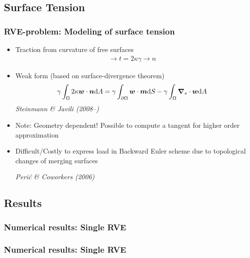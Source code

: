 \documentclass[11pt,mathserif]{beamer}
\newcommand{\roughcite}[1]{\textit{#1}}
\begin{document}
\subsection{Surface Tension}
\begin{frame}
 \frametitle{RVE-problem: Modeling of surface tension}
 \begin{itemize}
  \item Traction from curvature of free surfaces
 \begin{gather*}
  \to t = 2\kappa\gamma \to n
\end{gather*}
 \item Weak form (based on surface-divergence theorem)
\begin{gather*}
 \gamma\int_\Omega 2 \kappa \text{\boldmath $w$}\cdot \text{\boldmath $n$}\mathrm{d}A = \gamma\int_{\partial\Omega} \text{\boldmath $w$}\cdot\text{\boldmath $m$}\mathrm{d}S - \gamma\int_\Omega \text{\boldmath $\nabla$}_s \cdot \text{\boldmath $w$} \mathrm{d}A
 \label{eq:curvature}
\end{gather*}
 \roughcite{Steinmann \& Javili (2008--)}
 \item \alert{Note: Geometry dependent!} Possible to compute a tangent for higher order approximation

 \item Difficult/Costly to express load in Backward Euler scheme due to topological changes of merging surfaces

 \roughcite{Perić \& Coworkers (2006)}
 \end{itemize}
\end{frame}

\subsection{Results}
\begin{frame}
 \frametitle{Numerical results: Single RVE}
\begin{center}

\end{center}
\end{frame}

\begin{frame}
 \frametitle{Numerical results: Single RVE}
\begin{center}

\end{center}
\end{frame}
\end{document}
